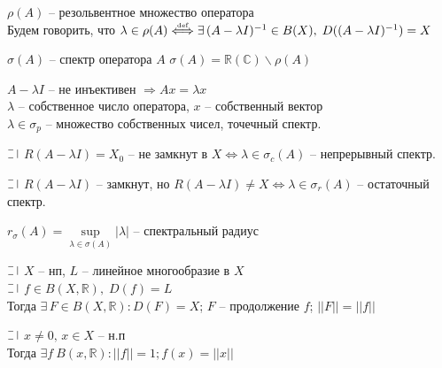 \begin{definition}
  $\rho(A)$ -- резольвентное множество оператора\\
  Будем говорить, что $\lambda \in \rho(A) \overset{\text{\tiny def}} \Longleftrightarrow 
    \exists \, (A - \lambda I)^{-1} \in B(X), \;  D((A - \lambda I)^{-1}) = X$
\end{definition}

\begin{definition}
  $\sigma(A)$ -- спектр оператора $A$ $\sigma(A) = \mathbb{R}(\mathbb{C}) \backslash \rho(A)$
\end{definition}

\begin{definition}
  $A - \lambda I$ -- не инъективен $\Longrightarrow Ax = \lambda x$\\
  $\lambda$ -- собственное число оператора, $x$ -- собственный вектор\\
  $\lambda \in \sigma_p$ -- множество собственных чисел, точечный спектр.
\end{definition}

\begin{definition}
  $\letus$ $R(A - \lambda I) = X_0$ -- не замкнут в $X \Longleftrightarrow \lambda \in \sigma_c(A)$ -- непрерывный спектр.
\end{definition}

\begin{definition}
  $\letus$ $R(A - \lambda I)$ -- замкнут, но $R(A - \lambda I) \ne X \Longleftrightarrow \lambda \in \sigma_r(A)$ -- остаточный спектр.
\end{definition}

\begin{definition}
	$r_{\sigma}(A) = \underset{\lambda \in \sigma(A)}{\sup} |\lambda|$ -- спектральный радиус
\end{definition}

\begin{theorem}
  $\letus$ $X$ -- нп, $L$ -- линейное многообразие в  $X$\\
  $\letus$ $f \in B(X, \mathbb{R}), \; D(f) = L$\\
  Тогда $\exists \, F \in B(X, \mathbb{R}): D(F) = X$; $F$ -- продолжение $f$; $||F|| = ||f||$
\end{theorem}
    
\begin{sled}
  $\letus$ $x \ne 0, \, x \in X$ -- н.п \\
  Тогда $\exists f \ B(x, \mathbb{R}): ||f|| = 1; f(x) = ||x||$
\end{sled}

